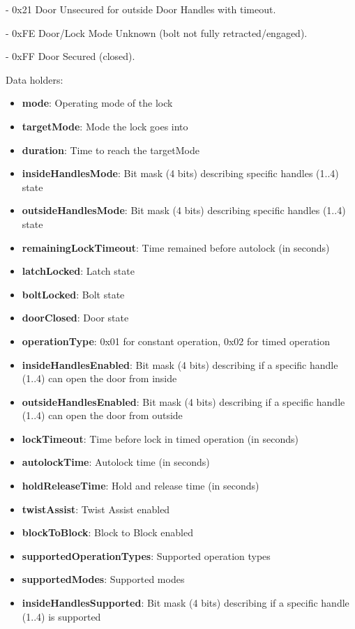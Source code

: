 - 0x21 Door Unsecured for outside Door Handles with timeout. 

- 0xFE Door/Lock Mode Unknown (bolt not fully retracted/engaged). 

- 0xFF Door Secured (closed).
\newline

\noindent
Data holders:

\begin{itemize}
\item \textbf{mode}: Operating mode of the lock
\item \textbf{targetMode}: Mode the lock goes into
\item \textbf{duration}: Time to reach the targetMode
\item \textbf{insideHandlesMode}: Bit mask (4 bits) describing specific handles (1..4) state
\item \textbf{outsideHandlesMode}: Bit mask (4 bits) describing specific handles (1..4) state
\item \textbf{remainingLockTimeout}: Time remained before autolock (in seconds)
\item \textbf{latchLocked}: Latch state
\item \textbf{boltLocked}: Bolt state
\item \textbf{doorClosed}: Door state
\item \textbf{operationType}: 0x01 for constant operation, 0x02 for timed operation
\item \textbf{insideHandlesEnabled}: Bit mask (4 bits) describing if a specific handle (1..4) can open the door from inside
\item \textbf{outsideHandlesEnabled}: Bit mask (4 bits) describing if a specific handle (1..4) can open the door from outside
\item \textbf{lockTimeout}: Time before lock in timed operation (in seconds)
\item \textbf{autolockTime}: Autolock time (in seconds)
\item \textbf{holdReleaseTime}: Hold and release time (in seconds)
\item \textbf{twistAssist}: Twist Assist enabled
\item \textbf{blockToBlock}: Block to Block enabled
\item \textbf{supportedOperationTypes}: Supported operation types
\item \textbf{supportedModes}: Supported modes
\item \textbf{insideHandlesSupported}: Bit mask (4 bits) describing if a specific handle (1..4) is supported

\end{itemize}
